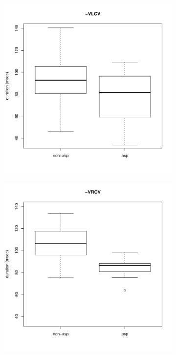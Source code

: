 \documentclass[11pt,a4paper,oneside,openany]{memoir}\usepackage[]{graphicx}\usepackage[]{color}
\newenvironment{knitrout}{}{} %
\begin{document}
\begin{figure}
\begin{subfigure}{.5\textwidth}
\centering
\begin{knitrout}
\color{fgcolor}
\includegraphics[width=\textwidth]{img/di-lat-clos-box-1} 

\end{knitrout}
\end{subfigure}
\begin{subfigure}{.5\textwidth}
\centering
\begin{knitrout}
\color{fgcolor}
\includegraphics[width=\textwidth]{img/di-rho-clos-box-1} 


\end{knitrout}
\end{subfigure}
\end{figure}
\end{document}
